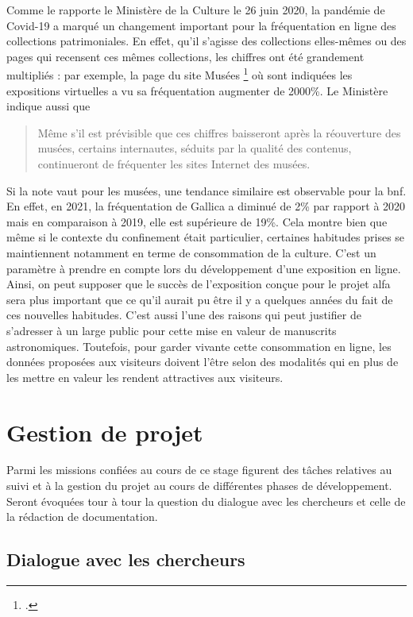     Comme le rapporte le Ministère de la Culture le 26 juin 2020, la pandémie de Covid-19 a marqué un changement important pour la fréquentation en ligne des collections patrimoniales. En effet, qu’il s’agisse des collections elles-mêmes ou des pages qui recensent ces mêmes collections, les chiffres ont été grandement multipliés : par exemple, la page du site Musées \footnote{\cite{ministeredelacultureetdelacommunicationChiffresClesStatistiques2021}.} où sont indiquées les expositions virtuelles a vu sa fréquentation augmenter de 2000\%. Le Ministère indique aussi que 
    \begin{quote}
    Même s’il est prévisible que ces chiffres baisseront après la réouverture des musées, certains internautes, séduits par la qualité des contenus, continueront de fréquenter les sites Internet des musées. 
    \end{quote}
    Si la note vaut pour les musées, une tendance similaire est observable pour la \acrshort{bnf}. En effet, en 2021, la fréquentation de Gallica a diminué de 2\% par rapport à 2020 mais en comparaison à 2019, elle est supérieure de 19\%. Cela montre bien que même si le contexte du confinement était particulier, certaines habitudes prises se maintiennent notamment en terme de consommation de la culture. C’est un paramètre à prendre en compte lors du développement d’une exposition en ligne. Ainsi, on peut supposer que le succès de l’exposition conçue pour le projet \acrshort{alfa} sera plus important que ce qu’il aurait pu être il y a quelques années du fait de ces nouvelles habitudes. C’est aussi l’une des raisons qui peut justifier de s’adresser à un large public pour cette mise en valeur de manuscrits astronomiques. Toutefois, pour garder vivante cette consommation en ligne, les données proposées aux visiteurs doivent l’être selon des modalités qui en plus de les mettre en valeur les rendent attractives aux visiteurs.
	
	\chapter{Gestion de projet}
	Parmi les missions confiées au cours de ce stage figurent des tâches relatives au suivi et à la gestion du projet au cours de différentes phases de développement. Seront évoquées tour à tour la question du dialogue avec les chercheurs et  celle de la rédaction de documentation.
	
	\section{Dialogue avec les chercheurs}
